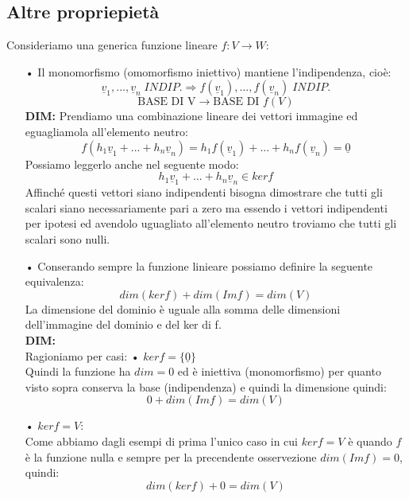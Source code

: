 \subsection{Altre propriepietà}
Consideriamo una generica funzione lineare $f: V \rightarrow W$:
\begin{itemize}
\item[•] Il monomorfismo (omomorfismo iniettivo) mantiene l'indipendenza, cioè:
$$  \underline{v}_1,...,\underline{v}_n \; INDIP. \Rightarrow f(\underline{v}_1),...,f(\underline{v}_n) \; INDIP.$$
$$ \text{BASE DI V} \rightarrow \text{BASE DI }f(V) $$
\textbf{DIM:}
Prendiamo una combinazione lineare dei vettori immagine ed eguagliamola all’elemento
neutro:
$$ f(h_1\underline{v}_1+...+h_n\underline{v}_n) = h_1f(\underline{v}_1)+...+h_nf(\underline{v}_n) = \underline{0}   $$
Possiamo leggerlo anche nel seguente modo:
$$ h_1\underline{v}_1+...+h_n\underline{v}_n \in ker f $$
Affinché questi vettori siano indipendenti bisogna dimostrare che tutti gli scalari siano necessariamente pari a zero ma essendo i vettori indipendenti per ipotesi ed avendolo uguagliato all'elemento neutro troviamo che tutti gli scalari sono nulli.

\item[•] Conserando sempre la funzione linieare possiamo definire la seguente equivalenza:
$$ dim(ker f) + dim(Im f) = dim (V) $$ 
La dimensione del dominio è uguale alla somma delle dimensioni dell'immagine del dominio e del ker di f.\\
\textbf{DIM:}\\
Ragioniamo per casi:
\subitem • $ker f = \{\underline{0}\}$\\
Quindi la funzione ha $dim=0$ ed è iniettiva (monomorfismo) per quanto visto sopra conserva la base (indipendenza) e quindi la dimensione quindi:
$$ 0 + dim(Im f) = dim (V) $$

\subitem • $ker f = V$:\\
Come abbiamo dagli esempi di prima l'unico caso in cui $ker f = V$ è quando $f$ è la funzione nulla e sempre per la precendente osservezione $dim (Im f) = 0$, quindi:
$$ dim (ker f) + 0 = dim (V) $$


\end{itemize}
